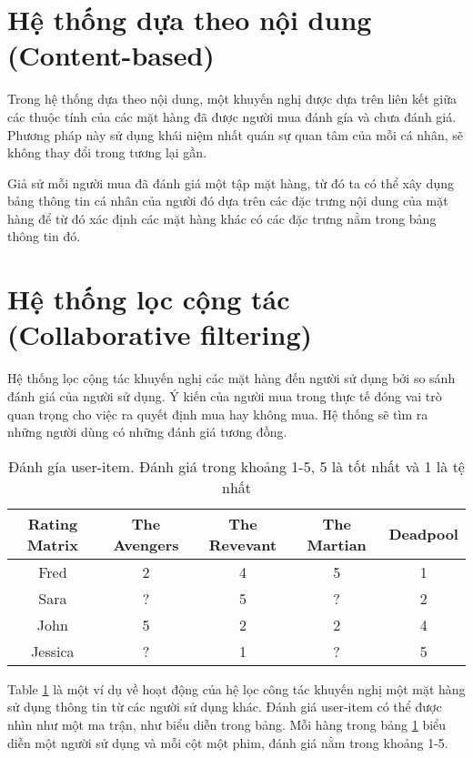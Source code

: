 \section{Hệ thống dựa theo nội dung (Content-based)}
Trong hệ thống dựa theo nội dung, một khuyến nghị được dựa trên liên kết giữa các thuộc tính của các mặt hàng đã được người mua đánh gía và chưa đánh giá. Phương pháp này sử dụng khái niệm nhất quán sự quan tâm của mỗi cá nhân, sẽ không thay đổi trong tương lại gần.

Giả sử mỗi người mua đã đánh giá một tập mặt hàng, từ đó ta có thể xây dụng bảng thông tin cá nhân của người đó dựa trên các đặc trưng nội dung của mặt hàng để từ đó xác định các mặt hàng khác có các đặc trưng nằm trong bảng thông tin đó.

\section{Hệ thống lọc cộng tác (Collaborative filtering)}
Hệ thống lọc cộng tác khuyến nghị các mặt hàng đến người sử dụng bởi so sánh đánh giá của người sử dụng. Ý kiến của người mua trong thực tế đóng vai trò quan trọng cho việc ra quyết định mua hay không mua. Hệ thống sẽ tìm ra những người dùng có những đánh giá tương đồng.

\begin{table}[H]
\caption{Đánh gía user-item. Đánh giá trong khoảng 1-5, 5 là tốt nhất và 1 là tệ nhất}
\label{table:1}
\begin{center}
\begin{tabular}{|c|c|c|c|c|}
\hline 
Rating Matrix & The Avengers & The Revevant & The Martian & Deadpool \\ 
\hline 
Fred & 2 & 4 & 5 & 1 \\ 
\hline 
Sara & ? & 5 & ? & 2 \\ 
\hline 
John & 5 & 2 & 2 & 4 \\ 
\hline 
Jessica & ? & 1 & ? & 5 \\ 
\hline 
\end{tabular} 
\end{center}
\end{table}

Table \ref{table:1} là một ví dụ về hoạt động của hệ lọc công tác khuyến nghị một mặt hàng sử dụng thông tin từ các người sử dụng khác. Đánh giá user-item có thể được nhìn như một ma trận, như biểu diễn trong bảng. Mỗi hàng trong bảng \ref{table:1} biểu diễn một người sử dụng và mỗi cột   một phim, đánh giá nằm trong khoảng 1-5.


